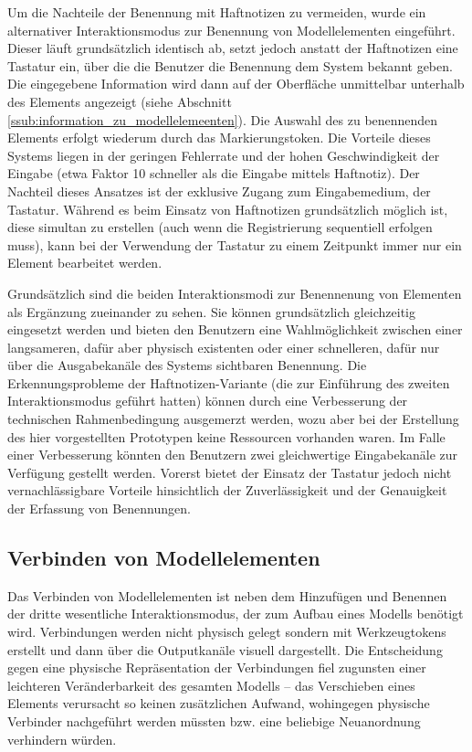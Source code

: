 Um die Nachteile der Benennung mit Haftnotizen zu vermeiden, wurde ein alternativer Interaktionsmodus zur Benennung von Modellelementen eingeführt. Dieser läuft grundsätzlich identisch ab, setzt jedoch anstatt der Haftnotizen eine Tastatur ein, über die die Benutzer die Benennung dem System bekannt geben. Die eingegebene Information wird dann auf der Oberfläche unmittelbar unterhalb des Elements angezeigt (siehe Abschnitt \ref{ssub:information_zu_modellelemeenten}). Die Auswahl des zu benennenden Elements erfolgt wiederum durch das Markierungstoken. Die Vorteile dieses Systems liegen in der geringen Fehlerrate und der hohen Geschwindigkeit der Eingabe (etwa Faktor 10 schneller als die Eingabe mittels Haftnotiz). Der Nachteil dieses Ansatzes ist der exklusive Zugang zum Eingabemedium, der Tastatur. Während es beim Einsatz von Haftnotizen grundsätzlich möglich ist, diese simultan zu erstellen (auch wenn die Registrierung sequentiell erfolgen muss), kann bei der Verwendung der Tastatur zu einem Zeitpunkt immer nur ein Element bearbeitet werden.

Grundsätzlich sind die beiden Interaktionsmodi zur Benennenung von Elementen als Ergänzung zueinander zu sehen. Sie können grundsätzlich gleichzeitig eingesetzt werden und bieten den Benutzern eine Wahlmöglichkeit zwischen einer langsameren, dafür aber physisch existenten oder einer schnelleren, dafür nur über die Ausgabekanäle des Systems sichtbaren Benennung. Die Erkennungsprobleme der Haftnotizen-Variante (die zur Einführung des zweiten Interaktionsmodus geführt hatten) können durch eine Verbesserung der technischen Rahmenbedingung ausgemerzt werden, wozu aber bei der Erstellung des hier vorgestellten Prototypen keine Ressourcen vorhanden waren. Im Falle einer Verbesserung könnten den Benutzern zwei gleichwertige Eingabekanäle zur Verfügung gestellt werden. Vorerst bietet der Einsatz der Tastatur jedoch nicht vernachlässigbare Vorteile hinsichtlich der Zuverlässigkeit und der Genauigkeit der Erfassung von Benennungen.


\subsection{Verbinden von Modellelementen} %
\label{sub:verbinden_von_modellelementen}

Das Verbinden von Modellelementen ist neben dem Hinzufügen und Benennen der dritte wesentliche Interaktionsmodus, der zum Aufbau eines Modells benötigt wird. Verbindungen werden nicht physisch gelegt sondern mit Werkzeugtokens erstellt und dann über die Outputkanäle visuell dargestellt. Die Entscheidung gegen eine physische Repräsentation der Verbindungen fiel zugunsten einer leichteren Veränderbarkeit des gesamten Modells -- das Verschieben eines Elements verursacht so keinen zusätzlichen Aufwand, wohingegen physische Verbinder nachgeführt werden müssten bzw. eine beliebige Neuanordnung verhindern würden.

